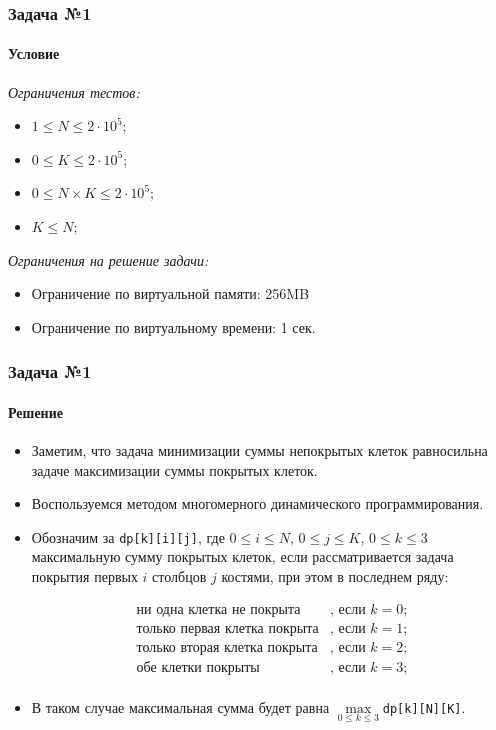 \documentclass{beamer}
\begin{document}
\begin{frame}
\frametitle{Задача №1}
\framesubtitle{Условие}

\begin{multicols}{2}
\emph{Ограничения тестов:}
\begin{itemize}
    \item $1 \leqslant N \leqslant 2 \cdot 10^{5}$;
    \item $0 \leqslant K \leqslant 2 \cdot 10^{5}$;
    \item $0 \leqslant N \times K \leqslant 2 \cdot 10^{5}$;
    \item $K \leqslant N$;
\end{itemize}
\columnbreak
\emph{Ограничения на решение задачи:}
\begin{itemize}
    \item Ограничение по виртуальной памяти: 256MB
    \item Ограничение по виртуальному времени: 1 сек.
\end{itemize}

\end{multicols} 

\end{frame}








\begin{frame}
\frametitle{Задача №1}
\framesubtitle{Решение}
\fontsize{11pt}{7.2}\selectfont

\begin{itemize}
\item Заметим, что задача минимизации суммы непокрытых клеток равносильна задаче максимизации суммы покрытых клеток.

\item Воспользуемся методом многомерного динамического программирования.

\item Обозначим за \texttt{dp[k][i][j]}, где $0 \leq i \leq N$, $0 \leq j \leq K$, $0 \leq k \leq 3$  максимальную сумму покрытых клеток, если рассматривается задача покрытия первых $i$ столбцов $j$ костями, при этом в последнем ряду:

\[
\begin{array}{ll}
        \text{ни одна клетка не покрыта} &\text{, если $k = 0$;}\\
        \text{только первая клетка покрыта} &\text{, если $k = 1$;}\\
        \text{только вторая клетка покрыта} &\text{, если $k = 2$;}\\
        \text{обе клетки покрыты} &\text{, если $k = 3$;}\\
\end{array}
\]

\item В таком случае максимальная сумма будет равна  $\max\limits_{0 \leq k \leq 3}$\texttt{dp[k][N][K]}.

\end{itemize}
\end{frame}
\end{document}
